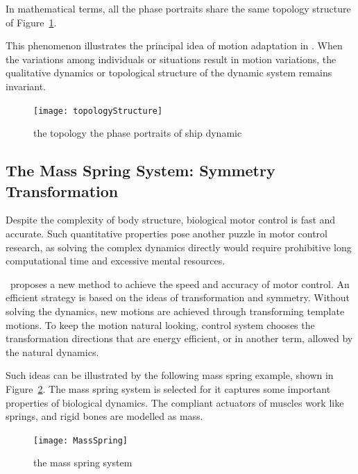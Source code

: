 In mathematical terms, all the phase portraits share the same topology structure of Figure~\ref{fig:topologyStructure}.

This phenomenon illustrates the principal idea of motion adaptation in {\moit}.
When the variations among individuals or situations result in motion variations, the qualitative dynamics or topological structure of the dynamic system remains invariant.

\begin{figure}[!htbp]
  \begin{center}
   \texttt{[image: topologyStructure]}
   \caption{the topology  the phase portraits of ship dynamic}
   \label{fig:topologyStructure}
  \end{center}
\end{figure}




\subsection{The Mass Spring System:  Symmetry Transformation}
Despite the complexity of body structure, biological motor control is fast and accurate.
Such quantitative properties pose another puzzle in motor control research, as solving the complex dynamics directly would require prohibitive long computational time and excessive mental resources.

{\moit}\ proposes a new method to achieve the  speed and accuracy of motor control.
An efficient strategy is based on the ideas of transformation and symmetry.
Without solving the dynamics, new motions are achieved through transforming template motions.
To keep the motion natural looking, control system chooses the transformation directions that are energy efficient, or in another term, allowed by the natural dynamics.


Such ideas can be illustrated by the following mass spring example, shown in Figure~\ref{fig:massspring}.
The mass spring system is selected for it captures some important properties of biological dynamics.
The compliant actuators of muscles work like springs, and rigid bones are modelled as mass.


\begin{figure}[!htbp]
  \begin{center}
    \texttt{[image: MassSpring]}
    \caption{the mass spring system}
    \label{fig:massspring}
  \end{center}
\end{figure}

